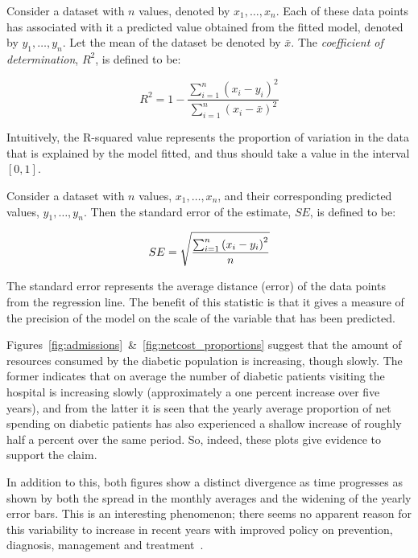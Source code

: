 \begin{definition}
    Consider a dataset with \(n\) values, denoted by \(x_1, \ldots, x_n\). Each
    of these data points has associated with it a predicted value obtained from
    the fitted model, denoted by \(y_1, \ldots, y_n\). Let the mean of the
    dataset be denoted by \(\bar x\). The \emph{coefficient of determination},
    \(R^2\), is defined to be:

    \[
        R^2 = 1 - \frac{\sum_{i=1}^{n} {\left(x_i - y_i\right)}^2}%
                       {\sum_{i=1}^{n} {\left(x_i - \bar x\right)}^2}
    \]

    Intuitively, the R-squared value represents the proportion of variation in
    the data that is explained by the model fitted, and thus should take a value
    in the interval \(\left[0, 1\right]\).
\end{definition}

\begin{definition}
    Consider a dataset with \(n\) values, \(x_1, \ldots, x_n\), and their
    corresponding predicted values, \(y_1, \ldots, y_n\). Then the standard
    error of the estimate, \(SE\), is defined to be:

    \[
        SE = \sqrt{%
            \frac{\sum_{i=1}^{n} {\left(x_i - y_i\right)}^2}{n}
        }
    \]

    The standard error represents the average distance (error) of the data
    points from the regression line. The benefit of this statistic is that it
    gives a measure of the precision of the model on the scale of the variable
    that has been predicted.
\end{definition}

Figures~\ref{fig:admissions}~\&~\ref{fig:netcost_proportions} suggest that the
amount of resources consumed by the diabetic population is increasing, though
slowly. The former indicates that on average the number of diabetic patients
visiting the hospital is increasing slowly (approximately a one percent increase
over five years), and from the latter it is seen that the yearly average
proportion of net spending on diabetic patients has also experienced a shallow
increase of roughly half a percent over the same period. So, indeed, these plots
give evidence to support the claim.

In addition to this, both figures show a distinct divergence as time progresses
as shown by both the spread in the monthly averages and the widening of the
yearly error bars. This is an interesting phenomenon; there seems no apparent
reason for this variability to increase in recent years with improved policy on
prevention, diagnosis, management and treatment~\cite{NICE}.


